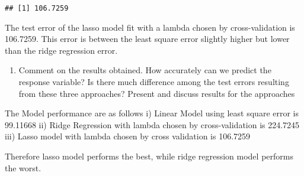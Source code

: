\documentclass[
]{article}
\providecommand{\tightlist}{%
  \setlength{\itemsep}{0pt}\setlength{\parskip}{0pt}}
\begin{document}
\begin{verbatim}
## [1] 106.7259
\end{verbatim}

The test error of the lasso model fit with a lambda chosen by
cross-validation is 106.7259. This error is between the least square
error slightly higher but lower than the ridge regression error.

\begin{enumerate}
\def\labelenumi{\alph{enumi})}
\setcounter{enumi}{4}
\tightlist
\item
  Comment on the results obtained. How accurately can we predict the
  response variable? Is there much difference among the test errors
  resulting from these three approaches? Present and discuss results for
  the approaches
\end{enumerate}

The Model performance are as follows i) Linear Model using least square
error is 99.11668 ii) Ridge Regression with lambda chosen by
cross-validation is 224.7245 iii) Lasso model with lambda chosen by
cross validation is 106.7259

Therefore lasso model performs the best, while ridge regression model
performs the worst.
\end{document}
